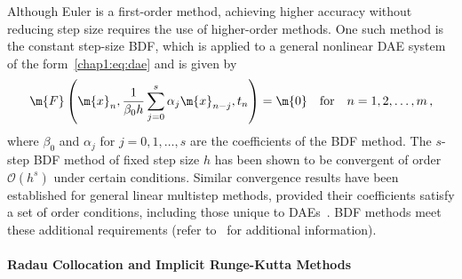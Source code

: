 Although Euler is a first-order method, achieving higher accuracy without reducing step size requires the use of higher-order methods. One such method is the constant step-size \ac{BDF}, which is applied to a general nonlinear \ac{DAE} system of the form~\eqref{chap1:eq:dae} and is given by
%
\begin{equation*}
  \m{F}\left(\m{x}_n, \dfrac{1}{\beta_0 h} \sum_{j=0}^{s} \alpha_j \m{x}_{n-j}, t_n\right) = \m{0} \quad \text{for} \quad n = 1, 2, \dots, m \, \text{,}
\end{equation*}
%
where $\beta_0$ and $\alpha_j$ for $j = 0, 1, \dots, s$ are the coefficients of the \ac{BDF} method. The $s$-step \ac{BDF} method of fixed step size $h$ has been shown to be convergent of order $\mathcal{O}(h^s)$ under certain conditions. Similar convergence results have been established for general linear multistep methods, provided their coefficients satisfy a set of order conditions, including those unique to \acp{DAE}~\cite{brenan1995numerical}. \ac{BDF} methods meet these additional requirements (refer to~\cite{brenan1995numerical} for additional information).

\paragraph{Radau Collocation and Implicit Runge-Kutta Methods}

